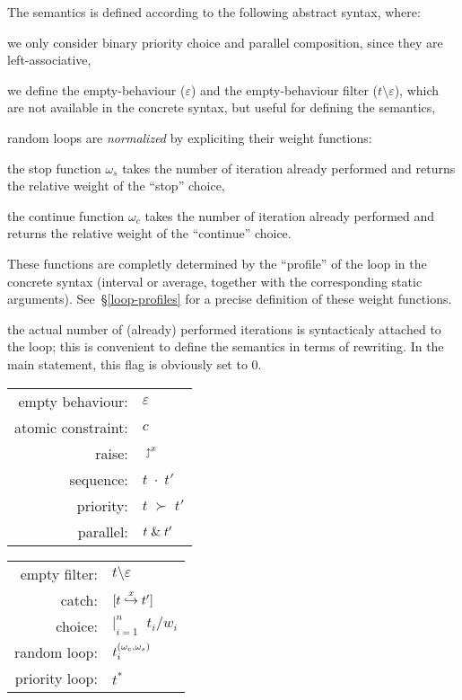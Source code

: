 The semantics is defined according to the following abstract syntax,
where:
\begin{minitemize}
\item we only consider binary priority choice and parallel composition,
since they are left-associative,
\item we define the empty-behaviour ($\varepsilon$)
and the empty-behaviour filter ($t\setminus\varepsilon$),
which are not available in the concrete syntax, but useful for defining
the semantics,
\item random loops are {\em normalized} by expliciting their
weight functions:
\begin{minitemize}
\item the stop function $\omega_s$ takes the number of iteration already performed
and returns the relative weight of the ``stop'' choice, 
\item the continue function $\omega_c$ takes the number of iteration already performed
and returns the relative weight of the ``continue'' choice. 
\end{minitemize}
These functions  are completly determined  by the ``profile''  of the
loop in the  concrete syntax (interval or average,  together with the
corresponding  static  arguments).  See~\S\ref{loop-profiles}  for  a
precise definition of these weight functions.
\item the actual number of (already) performed iterations is syntacticaly attached
to the loop; this is convenient to define the semantics in terms
of rewriting. In the main statement, this flag is obviously set
to $0$.
\end{minitemize}

\begin{minipage}{70mm}
\begin{tabular}{rl}
empty behaviour: & $\varepsilon$ \\
atomic constraint: & $c$ \\
raise: & $\diewith{x}$ \\
sequence: & $t \;\cdot\; t'$ \\
priority: & $t \;\succ\; t'$ \\
parallel: & $\merge{t}{t'}$
\end{tabular}
\end{minipage}\begin{minipage}{6cm}
\begin{tabular}{rl}
empty filter: & $t\setminus\varepsilon$ \\
catch: & $\catchdo{t}{x}{t'}$ \\
choice: & $|_{i=1}^n\;\;t_i/w_i$\\
random loop: & $\WLOOP{t}{i}$ \\
priority loop: & $t^*$
\end{tabular}
\end{minipage}

